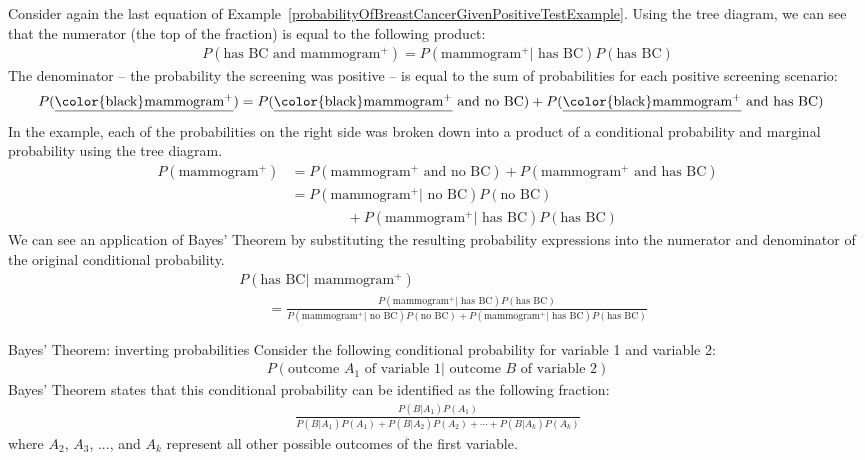 Consider again the last equation of Example~\ref{probabilityOfBreastCancerGivenPositiveTestExample}.
Using the tree diagram, we can see that the numerator (the top of the fraction) is equal to the following product:
\begin{align*}
P(\text{has BC and mammogram$^+$}) = P(\text{mammogram$^+$} | \text{ has BC})P(\text{has BC})
\end{align*}
The denominator -- the probability the screening was positive -- is equal to the sum of probabilities for each positive screening scenario:
\begin{align*}
P(\text{\underline{\color{black}mammogram$^+$}})
	&= P(\text{\underline{\color{black}mammogram$^+$} and no BC})
		+ P(\text{\underline{\color{black}mammogram$^+$} and has BC})
\end{align*}
In the example, each of the probabilities on the right side was broken down into a product of a conditional probability and marginal probability using the tree diagram.
\begin{align*}
P(\text{mammogram$^+$})
	&= P(\text{mammogram$^+$ and no BC}) + P(\text{mammogram$^+$ and has BC}) \\
	&= P(\text{mammogram$^+$} | \text{ no BC})P(\text{no BC}) \\
			   &\qquad\qquad + P(\text{mammogram$^+$} | \text{ has BC})P(\text{has BC})
\end{align*}
We can see an application of Bayes' Theorem by substituting the resulting probability expressions into the numerator and denominator of the original conditional probability.
\begin{align*}
& P(\text{has BC} | \text{ mammogram$^+$})  \\
& \qquad= \frac{P(\text{mammogram$^+$} | \text{ has BC})P(\text{has BC})}
	{P(\text{mammogram$^+$} | \text{ no BC})P(\text{no BC}) + P(\text{mammogram$^+$} | \text{ has BC})P(\text{has BC})}
\end{align*}

\D{\newpage}

\begin{onebox}{Bayes' Theorem: inverting probabilities}
Consider the following conditional probability for variable 1 and variable 2:\vspace{-1.5mm}
\begin{align*}
P(\text{outcome $A_1$ of variable 1} | \text{ outcome $B$ of variable 2})
\end{align*}
Bayes' Theorem states that this conditional probability can be identified as the following fraction:\vspace{-1.5mm}
\begin{align*}
\frac{P(B | A_1) P(A_1)}
	{P(B | A_1) P(A_1) + P(B | A_2) P(A_2) + \cdots + P(B | A_k) P(A_k)}
	\label{equationOfBayesTheorem}
\end{align*}
where $A_2$, $A_3$, ..., and $A_k$ represent all other possible outcomes of the first variable.
\end{onebox}

